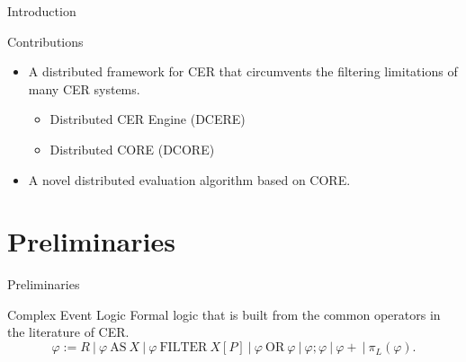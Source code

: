 \documentclass[xcolor=pdftex,dvipsnames,table]{beamer}
\begin{document}
\begin{frame}{Introduction}
  \begin{block}{Contributions}
   \begin{itemize}
     \item A distributed framework for CER that circumvents the filtering limitations of many CER systems.
      \begin{itemize}
        \pause
        \item Distributed CER Engine (DCERE)
        \pause
        \item Distributed CORE (DCORE)
      \end{itemize}
     \pause
     \item A novel distributed evaluation algorithm based on CORE.
   \end{itemize}
 \end{block}
\end{frame}


\section{Preliminaries}



\begin{frame}{Preliminaries}
  \begin{block}{Complex Event Logic}
    Formal logic that is built from the common operators in the literature of CER.
    \begin{equation*}
      \varphi := R    \ | \ \varphi \ \text{AS} \ X    \ | \    \varphi \ \text{FILTER} \ X[P]  \ | \   \varphi \ \text{OR} \ \varphi   \ | \  \varphi ; \varphi    \ | \  \varphi+ \ | \ \pi_{L}(\varphi).
    \end{equation*}
  \end{block}
\end{frame}
\end{document}
